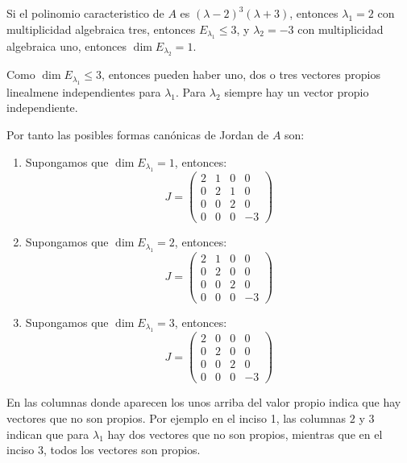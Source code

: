 		\begin{ejemplo}
			Si el polinomio caracteristico de $A$ es $(\lambda - 2)^3(\lambda + 3)$, entonces $\lambda_1 = 2$ con multiplicidad algebraica tres, entonces $E_{\lambda_1} \leq 3$, y $\lambda_2 = -3$ con multiplicidad algebraica uno, entonces $\dim{E_{\lambda_2}} = 1$.

			Como $\dim{E_{\lambda_1}} \leq 3$, entonces pueden haber uno, dos o tres vectores propios linealmene independientes para $\lambda_1$.
			Para $\lambda_2$ siempre hay un vector propio independiente.

			Por tanto las posibles formas canónicas de Jordan de $A$ son:

			\begin{enumerate}
				\item Supongamos que $\dim{E_{\lambda_1}} = 1$, entonces:
				\begin{equation*}
					J =
					\begin{pmatrix}
						2 & 1 & 0 & 0 \\
						0 & 2 & 1 & 0 \\
						0 & 0 & 2 & 0 \\
						0 & 0 & 0 & -3
					\end{pmatrix}
				\end{equation*}
				\item Supongamos que $\dim{E_{\lambda_1}} = 2$, entonces:
				\begin{equation*}
					J =
					\begin{pmatrix}
						2 & 1 & 0 & 0 \\
						0 & 2 & 0 & 0 \\
						0 & 0 & 2 & 0 \\
						0 & 0 & 0 & -3
					\end{pmatrix}
				\end{equation*}
				\item Supongamos que $\dim{E_{\lambda_1}} = 3$, entonces:
				\begin{equation*}
					J =
					\begin{pmatrix}
						2 & 0 & 0 & 0 \\
						0 & 2 & 0 & 0 \\
						0 & 0 & 2 & 0 \\
						0 & 0 & 0 & -3
					\end{pmatrix}
				\end{equation*}
			\end{enumerate}

			En las columnas donde aparecen los unos arriba del valor propio indica que hay vectores que no son propios.
			Por ejemplo en el inciso 1, las columnas $2$ y $3$ indican que para $\lambda_1$ hay dos vectores que no son propios, mientras que en el inciso 3, todos los vectores son propios.
		\end{ejemplo}

